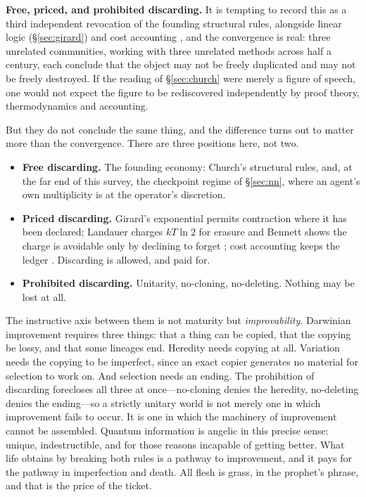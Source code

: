 \documentclass[11pt,a4paper]{article}
\begin{document}
\textbf{Free, priced, and prohibited discarding.} It is tempting to record this
as a third independent revocation of the founding structural rules, alongside
linear logic (\S\ref{sec:girard}) and cost accounting \cite{meredithcost}, and
the convergence is real: three unrelated communities, working with three
unrelated methods across half a century, each conclude that the object may not be
freely duplicated and may not be freely destroyed. If the reading of
\S\ref{sec:church} were merely a figure of speech, one would not expect the
figure to be rediscovered independently by proof theory, thermodynamics and
accounting.

But they do not conclude the same thing, and the difference turns out to matter
more than the convergence. There are three positions here, not two.

\begin{itemize}[leftmargin=1.4em,itemsep=0.15em]
\item \textbf{Free discarding.} The founding economy: Church's structural rules,
and, at the far end of this survey, the checkpoint regime of \S\ref{sec:nn},
where an agent's own multiplicity is at the operator's discretion.
\item \textbf{Priced discarding.} Girard's exponential permits contraction where
it has been declared; Landauer charges $kT\ln 2$ for erasure
\cite{landauer1961} and Bennett shows the charge is avoidable only by declining
to forget \cite{bennett1973}; cost accounting keeps the ledger
\cite{meredithcost}. Discarding is allowed, and paid for.
\item \textbf{Prohibited discarding.} Unitarity, no-cloning, no-deleting.
Nothing may be lost at all.
\end{itemize}

The instructive axis between them is not maturity but \emph{improvability}.
Darwinian improvement requires three things: that a thing can be copied, that the
copying be lossy, and that some lineages end. Heredity needs copying at all.
Variation needs the copying to be imperfect, since an exact copier generates no
material for selection to work on. And selection needs an ending. The
prohibition of discarding forecloses all three at once---no-cloning denies the
heredity, no-deleting denies the ending---so a strictly unitary world is not
merely one in which improvement fails to occur. It is one in which the machinery
of improvement cannot be assembled. Quantum information is angelic in this
precise sense: unique, indestructible, and for those reasons incapable of getting
better.
What life obtains by breaking both rules is a pathway to improvement, and it pays
for the pathway in imperfection and death. All flesh is grass, in the prophet's
phrase, and that is the price of the ticket.
\end{document}
